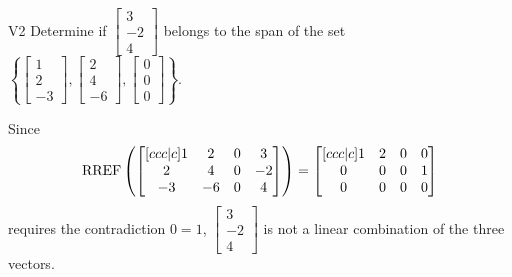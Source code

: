 \begin{problem}{V2}
  Determine if
  \(\begin{bmatrix} 3 \\ -2 \\ 4 \end{bmatrix}\)
  belongs to the span of the set
  \(\left\{
    \begin{bmatrix} 1 \\ 2 \\ -3 \end{bmatrix},
    \begin{bmatrix} 2 \\ 4 \\ -6 \end{bmatrix},
    \begin{bmatrix} 0 \\ 0 \\ 0 \end{bmatrix}
    \right\}
  \).
\end{problem}
\begin{solution}
  Since
  \[
    \operatorname{RREF}\left(
      \begin{bmatrix}[ccc|c]
        1 & 2 & 0 & 3 \\
        2 & 4 & 0 & -2 \\
        -3 & -6 & 0 & 4
      \end{bmatrix}
    \right) =
    \begin{bmatrix}[ccc|c]
      1 & 2 & 0 & 0 \\
      0 & 0 & 0 & 1 \\
      0 & 0 & 0 & 0
    \end{bmatrix}
  \]
  requires the contradiction \(0=1\),
  \(\begin{bmatrix} 3 \\ -2 \\ 4 \end{bmatrix}\) is
  not a linear combination of the three vectors.
\end{solution}
